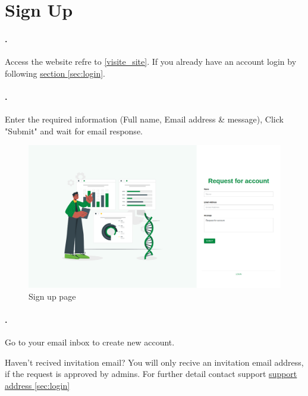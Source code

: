 \section{Sign Up}
\setcounter{stepcounter}{1}

\paragraph{.}Access the website refre to \ref{visite_site}.
If you already have an account login by following  \hyperref[sec:login]{section \ref{sec:login}}.

\paragraph{.} Enter the required information (Full name, Email address \& message), Click "Submit" and wait for email response.
\begin{figure}[h!]
  	\includegraphics[width=15cm]{screenshots/sign_up_page.png}
  	\caption{Sign up page}
  	\label{fig:sign_up_page}
\end{figure}

\paragraph{.} Go to your email inbox to create new account.

\begin{myremark}{Haven't recived invitation email?}\label{visite_site}
You will only recive an invitation email address, if the request is approved by admins. For further detail contact support \hyperref[sec:login]{support address \ref{sec:login}}
\end{myremark}

